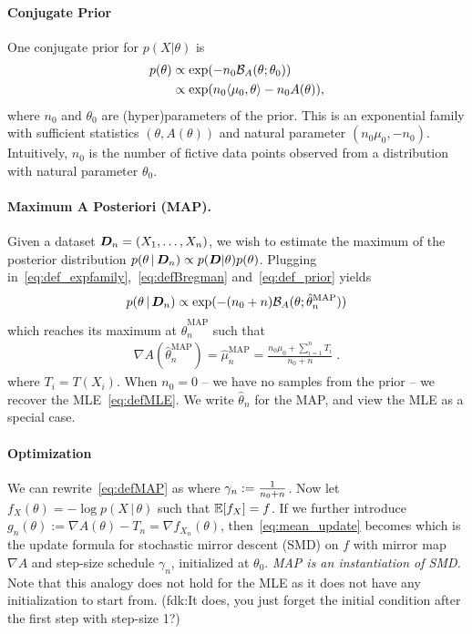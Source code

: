 \documentclass[twoside]{article}
\newcommand{\fdk}[1]{\textcolor{Periwinkle}{(fdk:#1)}}
\newcommand{\cond}{\,\vert\,}
\newcommand{\logpart}{A}
\newcommand{\conj}{\logpart^*}
\newcommand{\bregman}{\cB_\logpart}
\newcommand{\nat}{\theta}
\newcommand{\m}{\mu}
\newcommand{\meanp}{\m}
\newcommand{\lr}{\gamma} %
\newcommand{\MAPm}{\hat \m_n}
\newcommand{\MAPt}{\hat \nat_n}
\begin{document}
\paragraph{Conjugate Prior}
One conjugate prior \citep{agarwal2010geometric} for $p(X|\nat)$ is
\begin{align}
    p(\nat)
    &\propto \exp( - n_0 \bregman(\nat ; \nat_0) ) \\
    &\propto \exp(n_0 \langle \m_0, \nat \rangle - n_0 \logpart(\nat)),
    \label{eq:def_prior}
\end{align}
where $n_0$ and $\nat_0$ are (hyper)parameters of the prior.
This is an exponential family with sufficient statistics $(\nat ,\logpart(\nat))$ and natural parameter $(n_0 \m_0, -n_0)$.
Intuitively, $n_0$ is the number of fictive data points observed from a distribution with natural parameter $\nat_0$.

\paragraph{Maximum A Posteriori (MAP).}
Given a dataset ${\bm{D}}_n =(X_1,\dots,X_n)$, we wish to estimate the maximum of the posterior distribution $p(\nat \cond \mD_n) \propto p(\mD|\nat)p(\nat)$.
Plugging in~\eqref{eq:def_expfamily},~\eqref{eq:defBregman} and~\eqref{eq:def_prior} yields
\begin{align}
	p(\nat \cond \mD_n)
    \propto \exp(- (n_0+n) \bregman(\nat; \MAPt^\text{MAP}))
    \label{eq:joint_likelihood}
\end{align}
which reaches its maximum at $\MAPt^\text{MAP}$ such that
\begin{align}
    \nabla \logpart(\MAPt^\text{MAP}) = \MAPm^\text{MAP}
    = \frac{n_0 \meanp_0 + \sum_{i=1}^n T_i}{n_0+n} \; .
    \label{eq:defMAP}
\end{align}
where $T_i=T(X_i)$.
When $n_0=0$ -- we have no samples from the prior -- we recover the MLE~\eqref{eq:defMLE}.
We write $\MAPt$ for the MAP, and view the MLE as a special case.

\paragraph{Optimization}
We can rewrite~\eqref{eq:defMAP} as
\alignn{
\m_n = \m_{n-1}- \lr_n (\m_{n-1} - T_n)
\label{eq:mean_update}
}
where $\lr_n := \inv{n_0 + n}$.
Now let $f_X(\nat) = -\log p(X \cond \nat)$ such that $\operatorname{\mathbb{E}}[f_X] = f$.
If we further introduce $g_n(\nat) := \nabla\logpart(\nat) - T_n = \nabla f_{X_n}(\nat)$, then~\eqref{eq:mean_update} becomes
\alignn{
	\nabla\conj(\hat \nat_{n})
	= \nabla\conj(\hat \nat_{n-1}) - \lr_n g_n(\hat \nat_{n-1})
}
which is the update formula for stochastic mirror descent (SMD) on $f$ with mirror map $\nabla\logpart$
and step-size schedule $\lr_n$, initialized at $\nat_0$.
\emph{MAP is an instantiation of SMD.}
Note that this analogy does not hold for the MLE %
as it does not have any initialization to start from.
\fdk{It does, you just forget the initial condition after the first step with step-size 1?}
\end{document}
